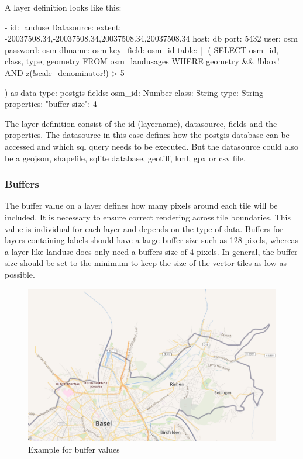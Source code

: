 A layer definition looks like this:
\begin{yamlcode}
- id: landuse
Datasource:
    extent: -20037508.34,-20037508.34,20037508.34,20037508.34
    host: db
    port: 5432
    user: osm
    password: osm
    dbname: osm
    key_field: osm_id
    table: |-
        (
            SELECT osm_id, class, type, geometry
            FROM osm_landusages
            WHERE geometry && !bbox!
            AND z(!scale_denominator!) > 5
        
        ) as data
    type: postgis
fields:
    osm_id: Number
    class: String
    type: String
properties:
    "buffer-size": 4
\end{yamlcode}
The layer definition consist of the id (layername), datasource, fields and the properties. The datasource in this case defines how the postgis database can be accessed and which sql query needs to be executed. But the datasource could also be a geojson, shapefile, sqlite database, geotiff, kml, gpx or csv file.

\subsubsection{Buffers}\label{buffers}
The buffer value on a layer defines how many pixels around each tile will be included. It is necessary to ensure correct rendering across tile boundaries. This value is individual for each layer and depends on the type of data. Buffers for layers containing labels should have a large buffer size such as 128 pixels, whereas a layer like landuse does only need a buffers size of 4 pixels. In general, the buffer size should be set to the minimum to keep the size of the vector tiles as low as possible.\cite{89_mapbox.com_2015}

\begin{figure}[H]
  \centering
  \includegraphics[width=1\textwidth]{images/buffer.png}
  \caption{Example for buffer values}
\end{figure}


